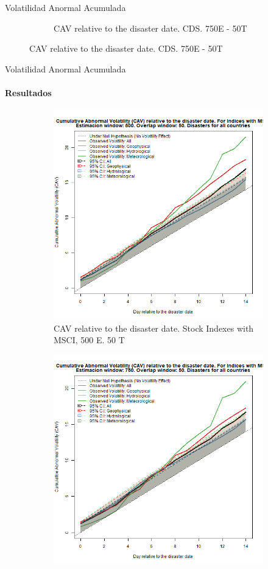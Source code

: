 \documentclass{beamer}
\begin{document}
\begin{frame}{Volatilidad Anormal Acumulada}
\begin{figure}
\begin{subfigure}{0.45\textwidth}
        \caption{CAV relative to the disaster date. CDS. 750E - 50T}
        \label{figure:cavcds75050}
    \end{subfigure}
    \end{figure}
\end{frame}

\begin{frame}{Volatilidad Anormal Acumulada}
\framesubtitle{Resultados}
\begin{figure}
    \begin{subfigure}{0.5\textwidth}
        \includegraphics[width=0.9\linewidth]{../Graficos_Paper/CAV/Ag//indices_benchmark_CAV_Est_500_tra_50.png}
        \caption{CAV relative to the disaster date. Stock Indexes with MSCI, 500 E. 50 T}
        \label{figure:cavind50050}
    \end{subfigure}%
    \begin{subfigure}{0.5\textwidth}
        \includegraphics[width=0.9\linewidth]{../Graficos_Paper/CAV/Ag//indices_benchmark_CAV_Est_750_tra_50.png}

\end{subfigure}
\end{figure}
\end{frame}
\end{document}
